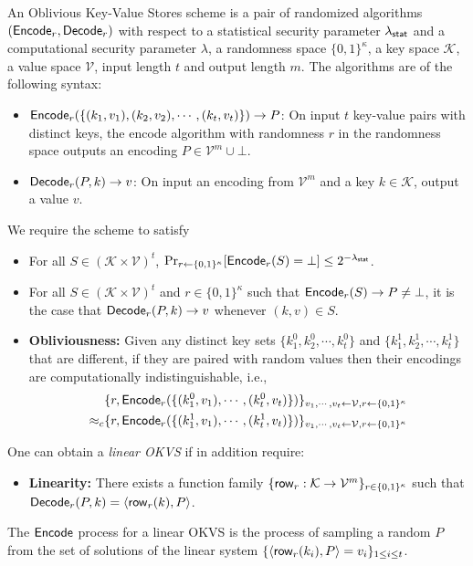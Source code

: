 \begin{definition}\label{def:OKVS}
  An Oblivious Key-Value Stores scheme is a pair of randomized algorithms $({\sf Encode}_r,{\sf Decode}_r)$ with respect to a statistical security parameter $\lambda_{\sf stat}$ and a computational security parameter $\lambda$, a randomness space $\{0,1\}^\kappa$, a key space $\mathcal{K}$, a value space $\mathcal{V}$, input length $t$ and output length $m$. The algorithms are of the following syntax: 
  \begin{itemize}
    \item ${\sf Encode}_r(\{(k_1,v_1),(k_2,v_2),\cdots,(k_t,v_t)\})\rightarrow P$: On input $t$ key-value pairs with distinct keys, the encode algorithm with randomness $r$ in the randomness space outputs an encoding $P\in\mathcal{V}^m\cup\bot$.
    \item ${\sf Decode}_r(P,k)\rightarrow v$: On input an encoding from $\mathcal{V}^m$ and a key $k\in\mathcal{K}$, output a value $v$. 
  \end{itemize}
  We require the scheme to satisfy
  \begin{itemize}
    \item For all $S\in(\mathcal{K}\times\mathcal{V})^t$, $\Pr_{r\leftarrow\{0,1\}^\kappa}[{\sf Encode}_r(S)=\bot]\le 2^{-\lambda_{\sf stat}}$. 
    \item For all $S\in(\mathcal{K}\times \mathcal{V})^t$ and $r\in \{0,1\}^\kappa$ such that ${\sf Encode}_r(S)\rightarrow P\not=\bot$, it is the case that ${\sf Decode}_r(P,k)\rightarrow v$ whenever $(k,v)\in S$. 
    \item \textbf{Obliviousness: }Given any distinct key sets $\{k_1^0,k_2^0,\cdots,k_t^0\}$ and $\{k_1^1,k_2^1,\cdots,k_t^1\}$ that are different, if they are paired with random values then their encodings are computationally indistinguishable, i.e., 
  \begin{align*}
    &\{r, {\sf Encode}_r(\{(k_1^0,v_1),\cdots,(k_t^0,v_t)\})\}_{v_1,\cdots,v_t\leftarrow \mathcal{V},r\leftarrow\{0,1\}^\kappa}\\
    \approx_c &\{r, {\sf Encode}_r(\{(k_1^1,v_1),\cdots,(k_t^1,v_t)\})\}_{v_1,\cdots,v_t\leftarrow \mathcal{V},r\leftarrow\{0,1\}^\kappa}
  \end{align*}
  \end{itemize}
One can obtain a \emph{linear OKVS} if in addition require:
\begin{itemize}
  \item \textbf{Linearity: }There exists a function family $\{{\sf row}_r:\mathcal{K}\rightarrow\mathcal{V}^m\}_{r\in\{0,1\}^\kappa}$ such that ${\sf Decode}_r(P,k) = \langle {\sf row}_r(k), P \rangle$. 
\end{itemize}
\end{definition}
The ${\sf Encode}$ process for a linear OKVS is the process of sampling a random $P$ from the set of solutions of the linear system $\{\langle {\sf row}_r(k_i), P \rangle = v_i\}_{1\le i\le t}$. 

